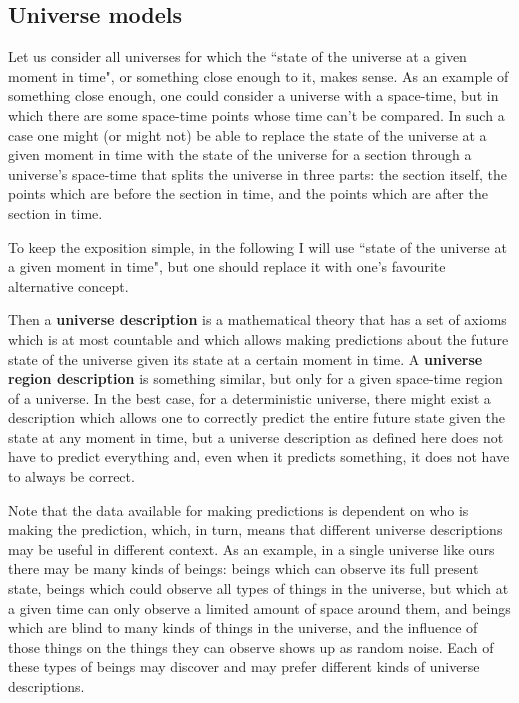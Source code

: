 \documentclass[a4paper
,draft
]{article}
\newcommand{\definitie}[1]{\textbf{#1}}
\newcommand{\ghilimele}[1]{``#1"}
\begin{document}
\subsection{Universe models}

Let us consider all universes for which the \ghilimele{state of the universe at a given moment in time}, or something close enough to it, makes sense. As an example of something close enough, one could consider a universe with a space-time, but in which there are some space-time points whose time can't be compared. In such a case one might (or might not) be able to replace the state of the universe at a given moment in time with the state of the universe for a section through a universe's space-time that splits the universe in three parts: the section itself, the points which are before the section in time, and the points which are after the section in time.

To keep the exposition simple, in the following I will use \ghilimele{state of the universe at a given moment in time}, but one should replace it with one's favourite alternative concept.

Then a \definitie{universe description} is a mathematical theory that has a set of axioms which is at most countable and which allows making predictions about the future state of the universe given its state at a certain moment in time. A \definitie{universe region description} is something similar, but only for a given space-time region of a universe. In the best case, for a deterministic universe, there might exist a description which allows one to correctly predict the entire future state given the state at any moment in time, but a universe description as defined here does not have to predict everything and, even when it predicts something, it does not have to always be correct.

Note that the data available for making predictions is dependent on who is making the prediction, which, in turn, means that different universe descriptions may be useful in different context. As an example, in a single universe like ours there may be many kinds of beings: beings which can observe its full present state, beings which could observe all types of things in the universe, but which at a given time can only observe a limited amount of space around them, and beings which are blind to many kinds of things in the universe, and the influence of those things on the things they can observe shows up as random noise. Each of these types of beings may discover and may prefer different kinds of universe descriptions.
\end{document}
